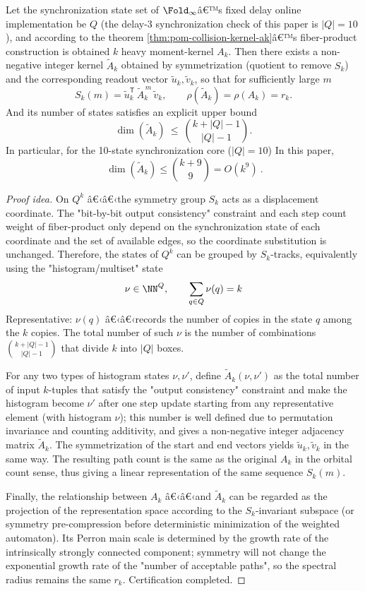 \begin{proposition}\label{prop:pom-ak-symmetric-compression}
Let the synchronization state set of $\Fold_\infty$â€™s fixed delay online implementation be $Q$ (the delay-$3$ synchronization check of this paper is $|Q|=10$), and according to the theorem \ref{thm:pom-collision-kernel-ak}â€™s fiber-product construction is obtained $k$ heavy moment-kernel \(A_k\).
Then there exists a non-negative integer kernel \(\widetilde A_k\) obtained by symmetrization (quotient to remove $S_k$) and the corresponding readout vector \(\widetilde u_k,\widetilde v_k\), so that for sufficiently large $m$
\[
S_k(m)=\widetilde u_k^{\mathsf T}\,\widetilde A_k^{\,m}\,\widetilde v_k,
\qquad
\rho(\widetilde A_k)=\rho(A_k)=r_k.
\]
And its number of states satisfies an explicit upper bound
\[
\dim(\widetilde A_k)\ \le\ \binom{k+|Q|-1}{|Q|-1}.
\]
In particular, for the 10-state synchronization core ($|Q|=10$) In this paper,
\[
\boxed{\ \dim(\widetilde A_k)\le \binom{k+9}{9}=O(k^9)\ }.
\]
\end{proposition}
\begin{proof}[Proof idea]
On $Q^k$ â€‹â€‹the symmetry group $S_k$ acts as a displacement coordinate. The "bit-by-bit output consistency" constraint and each step count weight of fiber-product only depend on the synchronization state of each coordinate and the set of available edges, so the coordinate substitution is unchanged. Therefore, the states of $Q^k$ can be grouped by $S_k$-tracks, equivalently using the "histogram/multiset" state
\[
\nu\in\NN^{Q},\qquad \sum_{q\in Q}\nu(q)=k
\]
Representative: $\nu(q)$ â€‹â€‹records the number of copies in the state $q$ among the $k$ copies. The total number of such $\nu$ is the number of combinations \(\binom{k+|Q|-1}{|Q|-1}\) that divide $k$ into $|Q|$ boxes.

For any two types of histogram states $\nu,\nu'$, define \(\widetilde A_k(\nu,\nu')\) as the total number of input $k$-tuples that satisfy the "output consistency" constraint and make the histogram become $\nu'$ after one step update starting from any representative element (with histogram $\nu$); this number is well defined due to permutation invariance and counting additivity, and gives a non-negative integer adjacency matrix \(\widetilde A_k\). The symmetrization of the start and end vectors yields \(\widetilde u_k,\widetilde v_k\) in the same way. The resulting path count is the same as the original $A_k$ in the orbital count sense, thus giving a linear representation of the same sequence $S_k(m)$.

Finally, the relationship between $A_k$ â€‹â€‹and $\widetilde A_k$ can be regarded as the projection of the representation space according to the $S_k$-invariant subspace (or symmetry pre-compression before deterministic minimization of the weighted automaton). Its Perron main scale is determined by the growth rate of the intrinsically strongly connected component; symmetry will not change the exponential growth rate of the "number of acceptable paths", so the spectral radius remains the same \(r_k\). Certification completed.
\end{proof}

